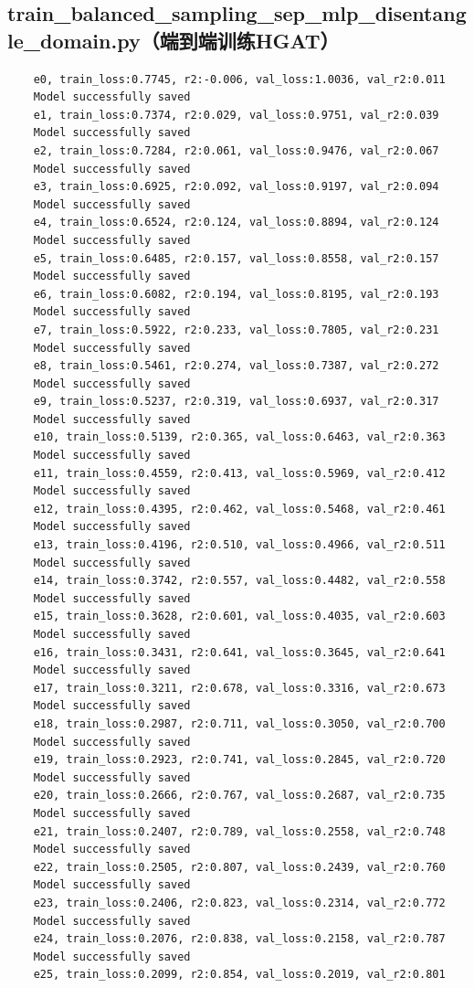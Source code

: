 \documentclass[a4paper, 12pt]{article}
\begin{document}
	\subsection{train\_balanced\_sampling\_sep\_mlp\_disentangle\_domain.py（端到端训练HGAT）}		
	\begin{lstlisting}	
	e0, train_loss:0.7745, r2:-0.006, val_loss:1.0036, val_r2:0.011
	Model successfully saved
	e1, train_loss:0.7374, r2:0.029, val_loss:0.9751, val_r2:0.039
	Model successfully saved
	e2, train_loss:0.7284, r2:0.061, val_loss:0.9476, val_r2:0.067
	Model successfully saved
	e3, train_loss:0.6925, r2:0.092, val_loss:0.9197, val_r2:0.094
	Model successfully saved
	e4, train_loss:0.6524, r2:0.124, val_loss:0.8894, val_r2:0.124
	Model successfully saved
	e5, train_loss:0.6485, r2:0.157, val_loss:0.8558, val_r2:0.157
	Model successfully saved
	e6, train_loss:0.6082, r2:0.194, val_loss:0.8195, val_r2:0.193
	Model successfully saved
	e7, train_loss:0.5922, r2:0.233, val_loss:0.7805, val_r2:0.231
	Model successfully saved
	e8, train_loss:0.5461, r2:0.274, val_loss:0.7387, val_r2:0.272
	Model successfully saved
	e9, train_loss:0.5237, r2:0.319, val_loss:0.6937, val_r2:0.317
	Model successfully saved
	e10, train_loss:0.5139, r2:0.365, val_loss:0.6463, val_r2:0.363
	Model successfully saved
	e11, train_loss:0.4559, r2:0.413, val_loss:0.5969, val_r2:0.412
	Model successfully saved
	e12, train_loss:0.4395, r2:0.462, val_loss:0.5468, val_r2:0.461
	Model successfully saved
	e13, train_loss:0.4196, r2:0.510, val_loss:0.4966, val_r2:0.511
	Model successfully saved
	e14, train_loss:0.3742, r2:0.557, val_loss:0.4482, val_r2:0.558
	Model successfully saved
	e15, train_loss:0.3628, r2:0.601, val_loss:0.4035, val_r2:0.603
	Model successfully saved
	e16, train_loss:0.3431, r2:0.641, val_loss:0.3645, val_r2:0.641
	Model successfully saved
	e17, train_loss:0.3211, r2:0.678, val_loss:0.3316, val_r2:0.673
	Model successfully saved
	e18, train_loss:0.2987, r2:0.711, val_loss:0.3050, val_r2:0.700
	Model successfully saved
	e19, train_loss:0.2923, r2:0.741, val_loss:0.2845, val_r2:0.720
	Model successfully saved
	e20, train_loss:0.2666, r2:0.767, val_loss:0.2687, val_r2:0.735
	Model successfully saved
	e21, train_loss:0.2407, r2:0.789, val_loss:0.2558, val_r2:0.748
	Model successfully saved
	e22, train_loss:0.2505, r2:0.807, val_loss:0.2439, val_r2:0.760
	Model successfully saved
	e23, train_loss:0.2406, r2:0.823, val_loss:0.2314, val_r2:0.772
	Model successfully saved
	e24, train_loss:0.2076, r2:0.838, val_loss:0.2158, val_r2:0.787
	Model successfully saved
	e25, train_loss:0.2099, r2:0.854, val_loss:0.2019, val_r2:0.801

\end{lstlisting}
\end{document}
